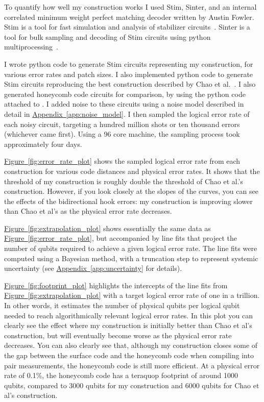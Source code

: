 \documentclass[onecolumn,unpublished,a4paper]{quantumarticle}
\theoremstyle{definition}
\theoremstyle{definition}
\theoremstyle{definition}
\DeclareRobustCommand{\app}[1]{\hyperref[app:#1]{Appendix~\ref*{app:#1}}}
\newcommand{\fig}[1]{\hyperref[fig:#1]{Figure~\ref*{fig:#1}}}
\begin{document}
To quantify how well my construction works I used Stim, Sinter, and an internal correlated minimum weight perfect matching decoder written by Austin Fowler.
Stim is a tool for fast simulation and analysis of stabilizer circuits~\cite{gidney2021stim}.
Sinter is a tool for bulk sampling and decoding of Stim circuits using python multiprocessing~\cite{sinter-source}.

I wrote python code to generate Stim circuits representing my construction, for various error rates and patch sizes.
I also implemented python code to generate Stim circuits reproducing the best construction described by Chao et al.~\cite{chao2020optimization}.
I also generated honeycomb code circuits for comparison, by using the python code attached to \cite{gidney2022planarhoneycomb}.
I added noise to these circuits using a noise model described in detail in \app{noise_model}.
I then sampled the logical error rate of each noisy circuit, targeting a hundred million shots or ten thousand errors (whichever came first).
Using a 96 core machine, the sampling process took approximately four days.

\fig{error_rate_plot} shows the sampled logical error rate from each construction for various code distances and physical error rates.
It shows that the threshold of my construction is roughly double the threshold of Chao et al.'s construction.
However, if you look closely at the slopes of the curves, you can see the effects of the bidirectional hook errors: my construction is improving slower than Chao et al's as the physical error rate decreases.

\fig{extrapolation_plot} shows essentially the same data as \fig{error_rate_plot}, but accompanied by line fits that project the number of qubits required to achieve a given logical error rate.
The line fits were computed using a Bayesian method, with a truncation step to represent systemic uncertainty (see \app{uncertainty} for details).

\fig{footprint_plot} highlights the intercepts of the line fits from \fig{extrapolation_plot} with a target logical error rate of one in a trillion.
In other words, it estimates the number of physical qubits per logical qubit needed to reach algorithmically relevant logical error rates.
In this plot you can clearly see the effect where my construction is initially better than Chao et al's construction, but will eventually become worse as the physical error rate decreases.
You can also clearly see that, although my construction closes some of the gap between the surface code and the honeycomb code when compiling into pair measurements, the honeycomb code is still more efficient.
At a physical error rate of 0.1\%, the honeycomb code has a teraquop footprint of around 1000 qubits, compared to 3000 qubits for my construction and 6000 qubits for Chao et al's construction.
\end{document}
